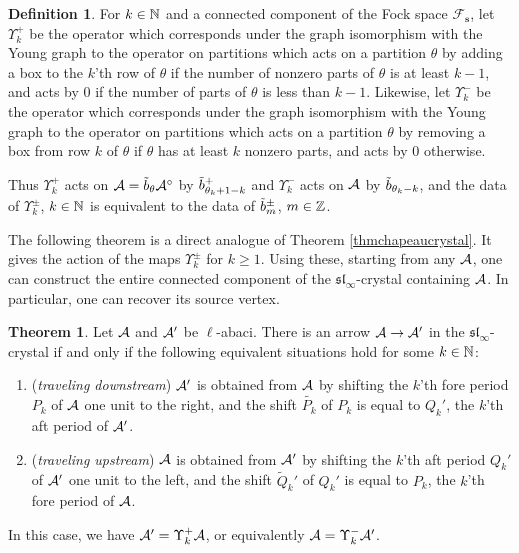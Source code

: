 \documentclass[12pt]{amsart}
\numberwithin{equation}{section}
\theoremstyle{definition}
\newtheorem{theorem}[equation]{Theorem}
\newtheorem{definition}[equation]{Definition}
\newcommand{\slinf}{\mathfrak{sl}_\infty}
\newcommand{\mbs}{\mathbf{s}}
\begin{document}
\begin{definition}\label{Ups_k} For $k\in\mathbb{N}$ and a connected component of the Fock space $\mathcal{F}_\mbs$, let $\Upsilon_k^+$ be the operator which corresponds under the graph isomorphism with the Young graph to the operator on partitions which acts on a partition $\theta$ by adding a box to the $k$'th row of $\theta$ if the number of nonzero parts of $\theta$ is at least $k-1$, and acts by $0$ if the number of parts of $\theta$ is less than $k-1$. Likewise, let $\Upsilon_k^-$ be the operator which corresponds under the graph isomorphism with the Young graph to the operator on partitions which acts on a partition $\theta$ by removing a box from row $k$ of $\theta$ if $\theta$ has at least $k$ nonzero parts, and acts by $0$ otherwise.
\end{definition}
Thus $\Upsilon_k^+$ acts on $\mathcal{A}=\tilde{b}_\theta\mathcal{A}^\circ$ by ${\tilde{b}}_{\theta_k+1-k}^+$ and $\Upsilon_k^-$ acts on $\mathcal{A}$ by ${\tilde{b}}_{\theta_k-k}$, and the data of $\Upsilon_k^\pm$, $k\in\mathbb{N}$ is equivalent to the data of ${\tilde{b}}_m^\pm$, $m\in\mathbb{Z}$.

The following theorem is a direct analogue of Theorem \ref{thmchapeaucrystal}.
It gives the action of the maps $\Upsilon_k^\pm$ for $k\geq1$.
Using these, starting from any $\mathcal{A}$, one can construct the entire connected component of the $\slinf$-crystal containing $\mathcal{A}$.
In particular, one can recover its source vertex.

\begin{theorem}\label{thmedge}
Let $\mathcal{A}$ and $\mathcal{A}'$ be $\ell$-abaci.
There is an arrow $\mathcal{A}\to\mathcal{A}'$ in the $\slinf$-crystal if and only if the following equivalent situations hold for some $k\in\mathbb{N}$:
\begin{enumerate}
\item (\textit{traveling downstream}) 
$\mathcal{A}'$ is obtained from $\mathcal{A}$ by shifting the $k$'th fore period $P_k$ of $\mathcal{A}$ one unit to the right, and the shift $\tilde{P_k}$ of $P_k$ is equal to $Q_k'$, the $k$'th aft period of $\mathcal{A}'$. 
\item (\textit{traveling upstream})
$\mathcal{A}$ is obtained from $\mathcal{A}'$ by shifting the $k$'th aft period $Q_k'$ of $\mathcal{A}'$ one unit to the left, and the shift $\tilde{Q}_k'$ of $Q_k'$ is equal to $P_k$, the $k$'th fore period of $\mathcal{A}$. 
\end{enumerate}
In this case, we have $\mathcal{A}' = \Upsilon_k^+ \mathcal{A}$, or equivalently $\mathcal{A} = \Upsilon_k^-\mathcal{A}'$.
\end{theorem}
\end{document}
